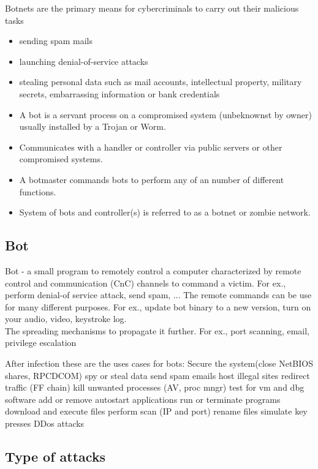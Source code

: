 Botnets are the primary means for cybercriminals to carry out their malicious tasks
\begin{itemize}
\item sending spam mails
\item launching denial-of-service attacks
\item stealing personal data such as mail accounts, intellectual property, military secrets, embarrassing information or bank credentials
\item A bot is a servant process on a compromised system (unbeknownst by owner) usually installed by a Trojan or Worm.
\item Communicates with a handler or controller via public servers or other compromised systems. 
\item A botmaster commands bots to perform any of an number of different functions.
\item System of bots and controller(s) is referred to as a botnet or zombie network.
\end{itemize}
\subsection{Bot}
Bot - a small program to remotely control a computer characterized by remote control and communication (CnC) channels to command a victim. For ex., perform denial-of service attack, send spam, ... The remote commands can be use for many different purposes. For ex., update bot binary to a new version, turn on your audio, video, keystroke log. \\The spreading mechanisms to propagate it further. For ex., port scanning, email, privilege escalation

After infection these are the uses cases for bots: Secure the system(close NetBIOS shares,
RPCDCOM) spy or steal data send spam emails host illegal sites redirect traffic (FF chain) kill
unwanted processes (AV, proc mngr) test for vm and dbg software add or remove autostart
applications run or terminate programs download and execute files perform scan (IP and port)
rename files simulate key presses DDos attacks


\subsection{Type of attacks}


